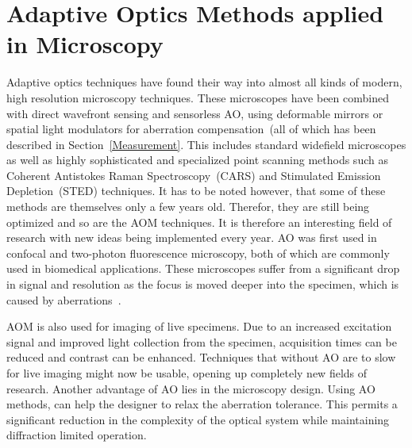 
\section{Adaptive Optics Methods applied in Microscopy}
\label{sec:ExperimentDiscussion}

Adaptive optics techniques have found their way into almost all kinds of modern, high resolution microscopy techniques. These microscopes have been combined with direct wavefront sensing and sensorless AO, using deformable mirrors or spatial light modulators for aberration compensation~(all of which has been described in Section~\ref{Measurement}. This includes standard widefield microscopes as well as highly sophisticated and specialized point scanning methods such as Coherent Antistokes Raman Spectroscopy~(CARS) and Stimulated Emission Depletion~(STED) techniques. It has to be noted however, that some of these methods are themselves only a few years old. Therefor, they are still being optimized and so are the AOM techniques. It is therefore an interesting field of research with new ideas being implemented every year.\newline
AO was first used in confocal and two-photon fluorescence microscopy, both of which are commonly used in biomedical applications. These microscopes suffer from a significant drop in signal and resolution as the focus is moved deeper into the specimen, which is caused by aberrations~\cite{characterizing_abberations}.

AOM is also used for imaging of live specimens. Due to an increased excitation signal and improved light collection from the specimen, acquisition times can be reduced and contrast can be enhanced. Techniques that without AO are to slow for live imaging might now be usable, opening up completely new fields of research. Another advantage of AO lies in the microscopy design. Using AO methods, can help the designer to relax the aberration tolerance. This permits a significant reduction in the complexity of the optical system while maintaining diffraction limited operation.


